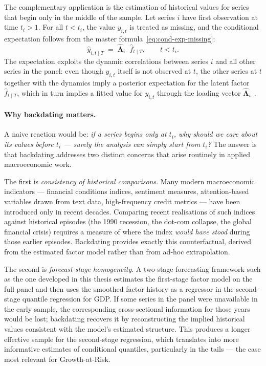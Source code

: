 \documentclass[11pt, a4paper, oneside]{article}
\newcommand{\mL}{\boldsymbol{\Lambda}}
\begin{document}
The complementary application is the estimation of historical values
for series that begin only in the middle of the sample. Let series
$i$ have first observation at time $t_i > 1$. For all $t < t_i$, the
value $y_{i,t}$ is treated as missing, and the conditional expectation
follows from the master formula~\eqref{eq:cond-exp-missing}:
\begin{equation}
\hat{y}_{i, t \mid T}
\;=\; \hat{\mL}_{i \cdot}\, \hat{f}_{t \mid T},
\qquad t < t_i.
\label{eq:backdating}
\end{equation}
The expectation exploits the dynamic correlations between series $i$
and all other series in the panel: even though $y_{i,t}$ itself is
not observed at $t$, the other series at $t$ together with the
dynamics imply a posterior expectation for the latent factor
$\hat{f}_{t \mid T}$, which in turn implies a fitted value for
$y_{i,t}$ through the loading vector $\hat{\mL}_{i \cdot}$.

\paragraph{Why backdating matters.}
A naive reaction would be: \emph{if a series begins only at $t_i$,
why should we care about its values before $t_i$ — surely the
analysis can simply start from $t_i$?} The answer is that
backdating addresses two distinct concerns that arise routinely in
applied macroeconomic work.

The first is \emph{consistency of historical comparisons}. Many
modern macroeconomic indicators — financial conditions indices,
sentiment measures, attention-based variables drawn from text data,
high-frequency credit metrics — have been introduced only in
recent decades. Comparing recent realisations of such indices
against historical episodes (the 1990 recession, the dot-com
collapse, the global financial crisis) requires a measure of where
the index \emph{would have stood} during those earlier episodes.
Backdating provides exactly this counterfactual, derived from the
estimated factor model rather than from ad-hoc extrapolation.

The second is \emph{forecast-stage homogeneity}. A two-stage
forecasting framework such as the one developed in this thesis
estimates the first-stage factor model on the full panel and then
uses the smoothed factor history as a regressor in the second-stage
quantile regression for GDP. If some series in the panel were
unavailable in the early sample, the corresponding cross-sectional
information for those years would be lost; backdating recovers it
by reconstructing the implied historical values consistent with
the model's estimated structure. This produces a longer effective
sample for the second-stage regression, which translates into more
informative estimates of conditional quantiles, particularly in the
tails — the case most relevant for Growth-at-Risk.
\end{document}
